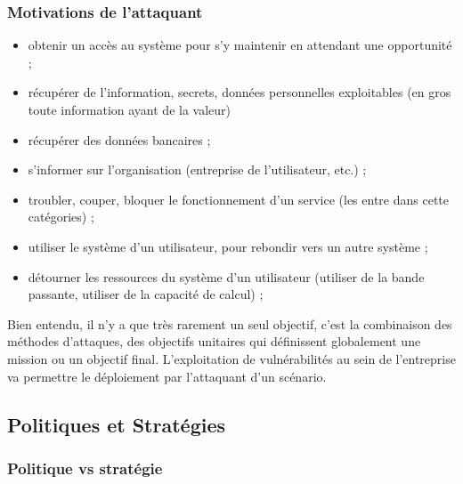 \begin{frame}
\frametitle<presentation>{Motivations de l'attaquant}

\begin{itemize}
\item obtenir un accès au système pour s’y maintenir en attendant une opportunité ;
\item récupérer de l’information, secrets, données personnelles exploitables (en gros toute information ayant de la valeur)
\item récupérer des données bancaires ;
\item s'informer sur l'organisation (entreprise de l'utilisateur, etc.) ;
\item troubler, couper, bloquer le fonctionnement d'un service (les  entre dans cette catégories) ;
\item utiliser le système d’un utilisateur, pour rebondir vers un autre système ;
\item détourner les ressources du système d’un utilisateur (utiliser de la bande passante, utiliser de la capacité de calcul) ;
\end{itemize}
\end{frame}

Bien entendu, il n’y a que très rarement un seul objectif, c’est la combinaison des méthodes d’attaques, des objectifs unitaires qui définissent globalement une mission ou un objectif final. L’exploitation de vulnérabilités au sein de l’entreprise va permettre le déploiement par l’attaquant d’un scénario.

\subsection{Politiques et Stratégies}

\begin{frame}
\frametitle<presentation>{Politique vs stratégie}


\end{frame}


